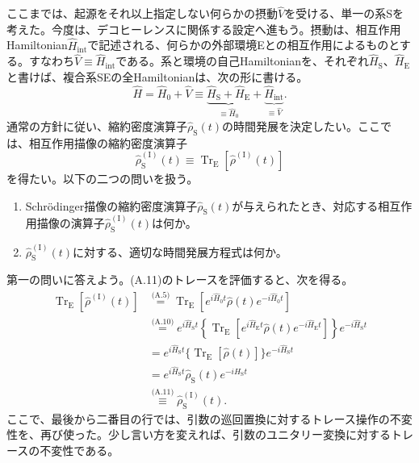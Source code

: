 \hypertarget{srcpage:381}{}\label{srcpage:381}
ここまでは、起源をそれ以上指定しない何らかの摂動$\hat V$を受ける、単一の系Sを考えた。今度は、デコヒーレンスに関係する設定へ進もう。摂動は、相互作用Hamiltonian$\hat H_{\mathrm{int}}$で記述される、何らかの外部環境Eとの相互作用によるものとする。すなわち$\hat V\equiv\hat H_{\mathrm{int}}$である。系と環境の自己Hamiltonianを、それぞれ$\hat H_{\mathrm S}$、$\hat H_{\mathrm E}$と書けば、複合系SEの全Hamiltonianは、次の形に書ける。
\begin{equation}
\hat H=\hat H_0+\hat V\equiv\underbrace{\hat H_{\mathrm S}+\hat H_{\mathrm E}}_{\equiv\hat H_0}
+\underbrace{\hat H_{\mathrm{int}}}_{\equiv\hat V}.\tag{A.10}
\end{equation}
通常の方針に従い、縮約密度演算子$\hat\rho_{\mathrm S}(t)$の時間発展を決定したい。ここでは、相互作用描像の縮約密度演算子
\begin{equation}
\hat\rho_{\mathrm S}^{(\mathrm I)}(t)\equiv\operatorname{Tr}_{\mathrm E}[\hat\rho^{(\mathrm I)}(t)]\tag{A.11}
\end{equation}
を得たい。以下の二つの問いを扱う。
\begin{enumerate}
\item Schrödinger描像の縮約密度演算子$\hat\rho_{\mathrm S}(t)$が与えられたとき、対応する相互作用描像の演算子$\hat\rho_{\mathrm S}^{(\mathrm I)}(t)$は何か。
\item $\hat\rho_{\mathrm S}^{(\mathrm I)}(t)$に対する、適切な時間発展方程式は何か。
\end{enumerate}
第一の問いに答えよう。(A.11)のトレースを評価すると、次を得る。
\begin{equation}
\begin{aligned}
\operatorname{Tr}_{\mathrm E}[\hat\rho^{(\mathrm I)}(t)]
&\overset{\text{(A.5)}}=\operatorname{Tr}_{\mathrm E}[e^{i\hat H_0t}\hat\rho(t)e^{-i\hat H_0t}]\\
&\overset{\text{(A.10)}}=e^{i\hat H_{\mathrm S}t}\left\{\operatorname{Tr}_{\mathrm E}[e^{i\hat H_{\mathrm E}t}\hat\rho(t)e^{-i\hat H_{\mathrm E}t}]\right\}e^{-i\hat H_{\mathrm S}t}\\
&=e^{i\hat H_{\mathrm S}t}\{\operatorname{Tr}_{\mathrm E}[\hat\rho(t)]\}e^{-i\hat H_{\mathrm S}t}\\
&=e^{i\hat H_{\mathrm S}t}\hat\rho_{\mathrm S}(t)e^{-i\hat H_{\mathrm S}t}\\
&\overset{\text{(A.11)}}\equiv\hat\rho_{\mathrm S}^{(\mathrm I)}(t).
\end{aligned}\tag{A.12}
\end{equation}
ここで、最後から二番目の行では、引数の巡回置換に対するトレース操作の不変性を、再び使った。少し言い方を変えれば、引数のユニタリー変換に対するトレースの不変性である。

